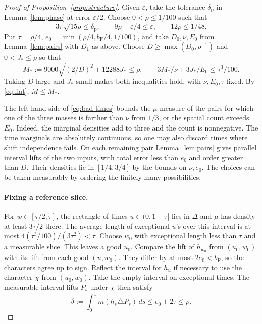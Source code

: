 \documentclass[11pt,reqno]{amsart}
\numberwithin{equation}{section}
\begin{document}
\begin{proof}[Proof of Proposition~\ref{prop:structure}]
Given \(\varepsilon\), take the tolerance \(\delta_{\mathrm p}\)
in Lemma~\ref{lem:phase} at error \(\varepsilon/2\).
Choose \(0<\rho\le1/100\) such that
\[
 3\pi\sqrt{15\rho}\le\delta_{\mathrm p},\qquad
 9\rho+\varepsilon/4\le\varepsilon,\qquad 12\rho\le1/48 .
\]
Put \(\tau=\rho/4\),
\(e_0=\min(\rho/4,b_{\mathrm F}/4,1/100)\), and take \(D_0,\nu,E_0\)
from Lemma~\ref{lem:pairs} with \(D_1\) as above.
Choose \(D\ge\max(D_0,\rho^{-1})\) and \(0<J_*\le\rho\) so that
\begin{equation}\label{eq:bad-times}
 M_*:=9000\sqrt{(2/D)^2+12288J_*}\le\rho,\qquad
 3M_*/\nu+3J_*/E_0\le\tau^3/100 .
\end{equation}
Taking \(D\) large and \(J_*\) small makes both inequalities hold,
with \(\nu,E_0,\tau\) fixed. By \eqref{eq:flat}, \(M\le M_*\).

The left-hand side of \eqref{eq:bad-times} bounds the
\(\mu\)-measure of the pairs for which one of the three masses
is farther than \(\nu\) from \(1/3\), or the spatial count
exceeds \(E_0\). Indeed, the marginal densities add to three
and the count is nonnegative. The time marginals are absolutely
continuous, so one may also discard times where shift independence
fails. On each remaining pair Lemma~\ref{lem:pairs} gives parallel
interval lifts of the two inputs, with total error less than \(e_0\)
and order greater than \(D\). Their densities lie in \([1/4,3/4]\)
by the bounds on \(\nu,e_0\). The choices can be taken measurably
by ordering the finitely many possibilities.

\paragraph{Fixing a reference slice.}
For \(w\in[\tau/2,\tau]\), the rectangle of times
\(u\in(0,1-\tau]\) lies in \(\Delta\) and \(\mu\) has density
at least \(3\tau/2\) there. The average length of exceptional
\(u\)'s over this interval is at most
\(4(\tau^3/100)/(3\tau^2)<\tau\). Choose \(w_0\)
with exceptional length less than \(\tau\) and a measurable slice.
This leaves a good \(u_0\). Compare the lift of \(h_{w_0}\)
from \((u_0,w_0)\) with its lift from each good \((u,w_0)\).
They differ by at most \(2e_0<b_{\mathrm F}\), so the characters agree up
to sign. Reflect the interval for \(h_u\) if necessary to use
the character \(\chi\) from \((u_0,w_0)\).
Take the empty interval on exceptional times. The measurable
interval lifts \(P_s\) under \(\chi\) then satisfy
\[
 \delta:=\int_0^1 m(h_s\triangle P_s)\,ds\le e_0+2\tau\le\rho .
\]


\end{proof}
\end{document}
